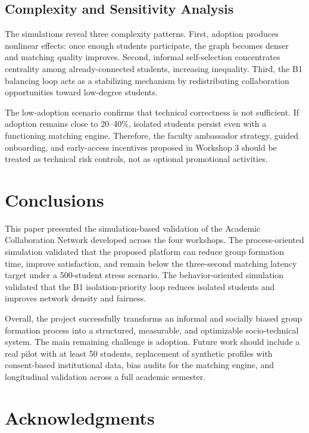 \documentclass[conference]{IEEEtran}
\begin{document}
\subsection{Complexity and Sensitivity Analysis}

The simulations reveal three complexity patterns. First, adoption produces nonlinear effects: once enough students participate, the graph becomes denser and matching quality improves. Second, informal self-selection concentrates centrality among already-connected students, increasing inequality. Third, the B1 balancing loop acts as a stabilizing mechanism by redistributing collaboration opportunities toward low-degree students.

The low-adoption scenario confirms that technical correctness is not sufficient. If adoption remains close to 20--40\%, isolated students persist even with a functioning matching engine. Therefore, the faculty ambassador strategy, guided onboarding, and early-access incentives proposed in Workshop 3 should be treated as technical risk controls, not as optional promotional activities.

\section{Conclusions}

This paper presented the simulation-based validation of the Academic Collaboration Network developed across the four workshops. The process-oriented simulation validated that the proposed platform can reduce group formation time, improve satisfaction, and remain below the three-second matching latency target under a 500-student stress scenario. The behavior-oriented simulation validated that the B1 isolation-priority loop reduces isolated students and improves network density and fairness.

Overall, the project successfully transforms an informal and socially biased group formation process into a structured, measurable, and optimizable socio-technical system. The main remaining challenge is adoption. Future work should include a real pilot with at least 50 students, replacement of synthetic profiles with consent-based institutional data, bias audits for the matching engine, and longitudinal validation across a full academic semester.

\section*{Acknowledgments}
\end{document}
